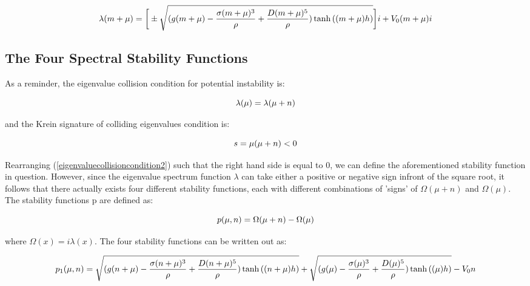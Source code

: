 \documentclass{article}
\begin{document}
\begin{equation} \label{eigenvalue}
  \lambda(m + \mu) = \bigg[\pm\sqrt{(g(m+\mu) - \frac{\sigma(m+\mu)^3}{\rho} + \frac{D(m+\mu)^5}{\rho})\tanh{((m+\mu)h)}}\bigg]i + V_{0}(m+\mu)i 
\\
\end{equation}


\vspace{15}

\subsection{The Four Spectral Stability Functions}

As a reminder, the eigenvalue collision condition for potential instability is:


\begin{equation} \label{eigenvaluecollisioncondition2}
  \lambda(\mu) = \lambda(\mu + n)
\\
\end{equation}

and the Krein signature of colliding eigenvalues condition is:

 \begin{equation} \label{krein2b}
  s = \mu(\mu + n) < 0
\\
\end{equation}


Rearranging (\ref{eigenvaluecollisioncondition2}) such that the right hand side is equal to 0, we can define the aforementioned stability function in question. However, since the eigenvalue spectrum function \(\lambda\) can take either a positive or negative sign infront of the square root, it follows that there actually exists four different stability functions, each with different combinations of 'signs' of \(\Omega(\mu + n)\) and \(\Omega(\mu)\). The stability functions p are defined as:

 \begin{equation} \label{eq1}
  p(\mu,n) = \Omega(\mu + n) - \Omega(\mu)
\\
\end{equation}

where \(\Omega(x) = i\lambda(x)\). The four stability functions can be written out as: 

 \begin{equation} \label{p1}
  \small{p_1(\mu,n) = \sqrt{(g(n+\mu) - \frac{\sigma(n+\mu)^3}{\rho} + \frac{D(n+\mu)^5}{\rho})\tanh{((n+\mu)h)}}   + \sqrt{(g(\mu) - \frac{\sigma(\mu)^3}{\rho} + \frac{D(\mu)^5}{\rho})\tanh{((\mu)h)}} - V_{0}n}
\\
\end{equation}
\end{document}
